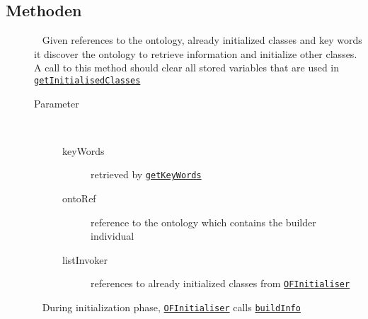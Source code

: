 \subsection{Methoden}
\begin{description}
\item[{\label{ontologyFramework.OFRunning.OFInitialising.OFBuilderInterface.buildInfo(java.lang.String[],ontologyFramework.OFContextManagement.OWLReferences,ontologyFramework.OFRunning.OFInvokingManager.OFBuildedListInvoker)}}]
~ Given references to the ontology, already initialized classes and key words it
 discover the ontology to retrieve information and initialize other classes.
 A call to this method should clear all stored variables that are used in 
 \texttt{\hyperlink{ontologyFramework.OFRunning.OFInitialising.OFBuilderInterface.getInitialisedClasses()}{getInitialisedClasses}}
\begin{description}
\item[Parameter] ~
\begin{description}
\item[keyWords]
retrieved by \texttt{\hyperlink{ontologyFramework.OFRunning.OFInitialising.OFBuilderCommon.getKeyWords(org.semanticweb.owlapi.model.OWLNamedIndividual,ontologyFramework.OFContextManagement.OWLReferences)}{getKeyWords}}
\item[ontoRef]
reference to the ontology which contains the builder individual
\item[listInvoker]
references to already initialized classes from \texttt{\hyperlink{ontologyFramework.OFRunning.OFInitialising.OFInitialiser-class}{OFInitialiser}}
\end{description}
\end{description}
\item[{\label{ontologyFramework.OFRunning.OFInitialising.OFBuilderInterface.getInitialisedClasses()}}]
~ During initialization phase, \texttt{\hyperlink{ontologyFramework.OFRunning.OFInitialising.OFInitialiser-class}{OFInitialiser}} calls \texttt{\hyperlink{ontologyFramework.OFRunning.OFInitialising.OFBuilderInterface.buildInfo(java.lang.String[],ontologyFramework.OFContextManagement.OWLReferences,ontologyFramework.OFRunning.OFInvokingManager.OFBuildedListInvoker)}{buildInfo}}

\end{description}
